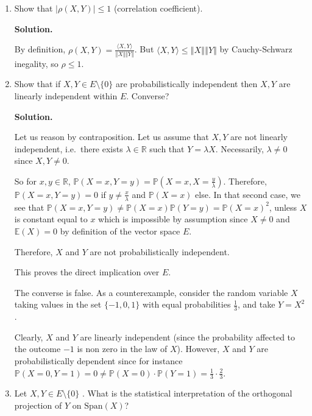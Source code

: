 \documentclass[12pt]{article}
\newcommand{\R}{\mathbb{R}}
\newcommand{\E}{\mathbb{E}}
\newcommand{\norm}[1]{\left\Vert #1\right\Vert}
\newcommand{\Span}[1]{\text{Span}(#1)}
\newenvironment{solution}{\vspace{0.2cm} \textbf{Solution.}}{}
\begin{document}
\begin{enumerate}[label=(\alph*)]
\begin{solution}
		\end{solution}
		\item Show that $|\rho(X, Y)| \leq 1$ (correlation coefficient).
	
		\begin{solution}
			
		By definition, $\rho(X, Y) = \frac{\langle X,Y \rangle}{\norm{X}\norm{Y}}$. But $\langle X,Y \rangle \leq \norm{X}\norm{Y}$ by Cauchy-Schwarz inegality, so $\rho \leq 1$.
			
		\end{solution}
		\item Show that if $X, Y \in E \setminus \{0\}$ are probabilistically independent then $X, Y$ are linearly independent within $E$. Converse?
		
		\begin{solution}
			
		Let us reason by contraposition.
		Let us assume that $X,Y$ are not linearly independent, i.e.\ there exists $\lambda \in \R$ such that $Y = \lambda X$. Necessarily, $\lambda \neq 0$ since $X,Y \neq 0$.
		
		So for $x,y \in \R$, $\mathbb{P}(X=x, Y=y) = \mathbb{P}(X=x, X= \frac{y}{\lambda})$.
		Therefore, $\mathbb{P}(X=x, Y=y) = 0$ if $y \neq \frac{x}{\lambda}$ and $\mathbb{P}(X=x)$ else.
		In that second case, we see that $\mathbb{P}(X=x, Y=y) \neq \mathbb{P}(X=x) \mathbb{P}(Y=y) = \mathbb{P}(X=x)^2$, unless $X$ is constant equal to $x$ which is impossible by assumption since $X \neq 0$ and $\E(X) = 0$ by definition of the vector space $E$.
		
		Therefore, $X$ and $Y$ are not probabilistically independent.
		
		This proves the direct implication over $E$.
		
		The converse is false. As a counterexample, consider the random variable $X$ taking values in the set $\{-1,0,1\}$ with equal probabilities $\frac{1}{3}$, and take $Y = X^2$.
		
		Clearly, $X$ and $Y$ are linearly independent (since the probability affected to the outcome $-1$ is non zero in the law of $X$).
		However, $X$ and $Y$ are probabilistically dependent since for instance $\mathbb{P}(X = 0, Y = 1) = 0 \neq \mathbb{P}(X=0)\cdot \mathbb{P}(Y=1) = \frac{1}{3} \cdot \frac{2}{3}$.
		
		\end{solution}
		\item Let $X, Y \in E \setminus \{0\}$ . What is the statistical interpretation of the orthogonal projection of $Y$ on $\Span	{X}$?
		

\end{enumerate}
\end{document}
